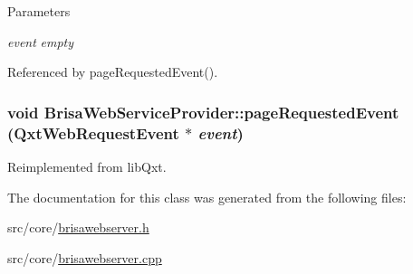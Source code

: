 \begin{DoxyParams}{Parameters}
\item[{\em event}]{\itshape empty\/} \end{DoxyParams}


Referenced by pageRequestedEvent().\hypertarget{classBrisaCore_1_1BrisaWebServiceProvider_a21fbddc4ca395a0da441602857ae493e}{
\subsubsection[{pageRequestedEvent}]{\setlength{\rightskip}{0pt plus 5cm}void BrisaWebServiceProvider::pageRequestedEvent (QxtWebRequestEvent $\ast$ {\em event})}}
\label{classBrisaCore_1_1BrisaWebServiceProvider_a21fbddc4ca395a0da441602857ae493e}


Reimplemented from libQxt. 

The documentation for this class was generated from the following files:\begin{DoxyCompactItemize}
\item 
src/core/\hyperlink{brisawebserver_8h}{brisawebserver.h}\item 
src/core/\hyperlink{brisawebserver_8cpp}{brisawebserver.cpp}\end{DoxyCompactItemize}
